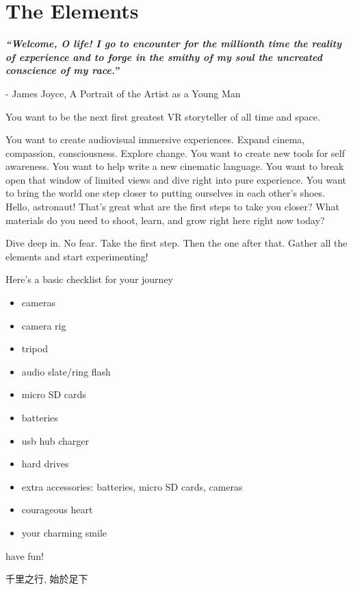 \chapter{The Elements}
\pagecolor{white}
\label{chap:1}
\begin{fullwidth}

{\itshape\bfseries “Welcome, O life! I go to encounter for the millionth time the reality of experience and to forge in the smithy of my soul the uncreated conscience of my race.”}

- James Joyce, A Portrait of the Artist as a Young Man
\vspace{\baselineskip}

\problem

{\large You want to be the next first greatest VR storyteller of all time and space. \par}

You want to create audiovisual immersive experiences. Expand cinema, compassion, consciousness. Explore change. You want to create new tools for self awareness. You want to help write a new cinematic language. You want to break open that window of limited views and dive right into pure experience. You want to bring the world one step closer to putting ourselves in each other’s shoes. Hello, astronaut! That’s great what are the first steps to take you closer? What materials do you need to shoot, learn, and grow right here right now today?

\solution

{\large Dive deep in. No fear. Take the first step. Then the one after that. Gather all the elements and start experimenting! \par}

Here’s a basic checklist for your journey

\begin{itemize}
\item cameras
\item camera rig
\item tripod
\item audio slate/ring flash
\item micro SD cards
\item batteries
\item usb hub charger
\item hard drives
\item extra accessories: batteries, micro SD cards, cameras
\item courageous heart
\item your charming smile
\end{itemize}
                
have fun!

\begin{CJK*}{UTF8}{gbsn}
千里之行, 始於足下
\clearpage\end{CJK*}

\clearpage
\end{fullwidth}
